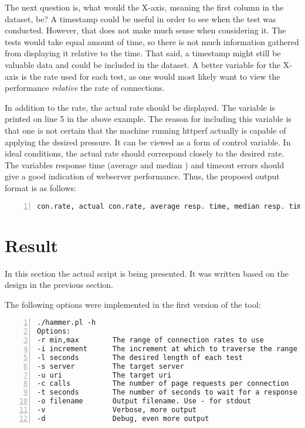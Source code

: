 The next question is, what would the X-axis, meaning the first column in the dataset, be? A timestamp could be useful in order to see when the test was conducted. However, that does not make much sense when considering it. The tests would take equal amount of time, so there is not much information gathered from displaying it relative to the time. That said, a timestamp might still be valuable data and could be included in the dataset. A better variable for the X-axis is the rate used for each test, as one would most likely want to view the performance \emph{relative} the rate of connections.

In addition to the rate, the actual rate should be displayed. The variable is printed on line 5 in the above example. The reason for including this variable is that one is not certain that the machine running httperf actually is capable of applying the desired pressure. It can be viewed as a form of control variable. In ideal conditions, the actual rate should correspond closely to the desired rate. The variables response time (average and median ) and timeout errors should give a good indication of webserver performance. Thus, the proposed output format is as follows: 


\begin{Verbatim}[commandchars=\\\{\},numbers=left,label=Proposed data output format]
con.rate, actual con.rate, average resp. time, median resp. time, errors, timestamp
\end{Verbatim}

\section{Result}

In this section the actual script is being presented. It was written based on the design in the previous section. 


The following options were implemented in the first version of the tool: 

\begin{Verbatim}[commandchars=\\\{\},numbers=left,label=All available options]
./hammer.pl -h
Options: 
-r min,max        The range of connection rates to use
-i increment      The increment at which to traverse the range
-l seconds        The desired length of each test
-s server         The target server
-u uri            The target uri
-c calls          The number of page requests per connection
-t seconds        The number of seconds to wait for a response
-o filename       Output filename. Use - for stdout
-v                Verbose, more output
-d                Debug, even more output
\end{Verbatim}



